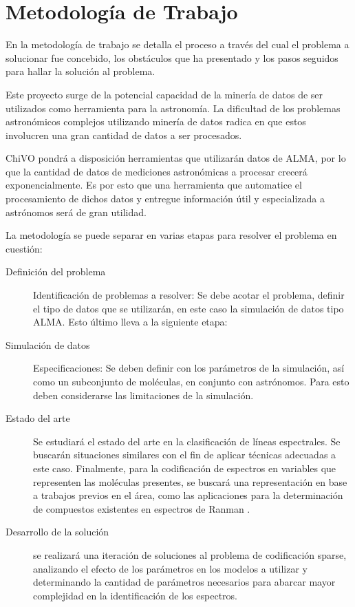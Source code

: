 \section{Metodología de Trabajo}

En la metodología de trabajo se detalla el proceso a través del cual el problema a solucionar fue concebido, los obstáculos que ha presentado y los pasos seguidos para hallar la solución al problema.

Este proyecto surge de la potencial capacidad de la minería de datos de ser utilizados como herramienta para la astronomía. La dificultad de los problemas astronómicos complejos utilizando minería de datos radica en que estos involucren una gran cantidad de datos a ser procesados.

ChiVO pondrá a disposición herramientas que utilizarán datos de ALMA, por lo que la cantidad de datos de mediciones astronómicas a procesar crecerá exponencialmente. Es por esto que una herramienta que automatice el procesamiento de dichos datos y entregue información útil y especializada a astrónomos será de gran utilidad.

La metodología se puede separar en varias etapas para resolver el problema en cuestión:


\begin{description}
\item [Definición del problema] Identificación de problemas a resolver: Se debe acotar el problema, definir el tipo de datos que se utilizarán, en este caso la simulación de datos tipo ALMA. Esto último lleva a la siguiente etapa:

\item [Simulación de datos] Especificaciones: Se deben definir con los parámetros de la simulación, así como un subconjunto de moléculas, en conjunto con astrónomos. Para esto deben considerarse las limitaciones de la simulación.

\item [Estado del arte] Se estudiará el estado del arte en la clasificación de líneas espectrales. Se buscarán situaciones similares con el fin de aplicar técnicas adecuadas a este caso. Finalmente, para la codificación de espectros en variables que representen las moléculas presentes, se buscará una representación en base a trabajos previos en el área, como las aplicaciones para la determinación de compuestos existentes en espectros de Ranman \cite{howley_effect_2005}.

\item [Desarrollo de la solución] se realizará una iteración de soluciones al problema de codificación sparse, analizando el efecto de los parámetros en los modelos a utilizar y determinando la cantidad de parámetros necesarios para abarcar mayor complejidad en la identificación de los espectros.
\end{description}



